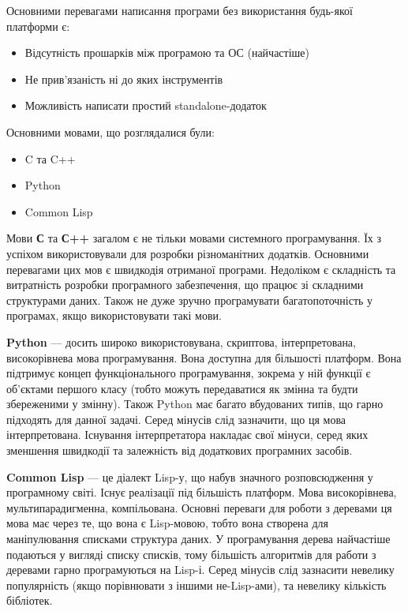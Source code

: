 Основними перевагами написання програми без використання будь-якої платформи є:
\begin{itemize}
	\item Відсутність прошарків між програмою та ОС (найчастіше)
	\item Не прив'язаність ні до яких інструментів
	\item Можливість написати простий standalone-додаток
\end{itemize}

Основними мовами, що розглядалися були:
\begin{itemize}
	\item C та C++
	\item Python
	\item Common Lisp
\end{itemize}

Мови \textbf{С} та \textbf{С++} загалом є не тільки мовами системного програмування. Їх з успіхом використовували для розробки різноманітних додатків. Основними перевагами цих мов є швидкодія отриманої програми. Недоліком є складність та витратність розробки програмного забезпечення, що працює зі складними структурами даних. Також не дуже зручно програмувати багатопоточність у програмах, якщо використовувати такі мови.

\textbf{Python} --- досить широко використовувана, скриптова, інтерпретована, високорівнева мова програмування. Вона доступна для більшості платформ. Вона підтримує концеп функціонального програмування, зокрема у ній функції є об'єктами першого класу (тобто можуть передаватися як змінна та будти збереженими у змінну). Також Python має багато вбудованих типів, що гарно підходять для данної задачі. Серед мінусів слід зазначити, що ця мова інтерпретована. Існування інтерпретатора накладає свої мінуси, серед яких зменшення швидкодії та залежність від додаткових програмних засобів.

\textbf{Common Lisp} --- це діалект Lisp-у, що набув значного розповсюдження у програмному світі. Існує реалізації під більшість платформ. Мова високорівнева, мультипарадигменна, компільована. Основні переваги для роботи з деревами ця мова має через те, що вона є Lisp-мовою, тобто вона створена для маніпулювання списками структура даних. У програмування дерева найчастіше подаються у вигляді списку списків, тому більшість алгоритмів для работи з деревами гарно програмуються на Lisp-і. Серед мінусів слід зазнасити невелику популярність (якщо порівнювати з іншими не-Lisp-ами), та невелику кількість бібліотек.

